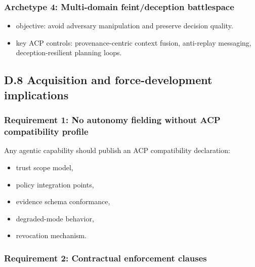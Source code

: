 \documentclass[
]{article}
\providecommand{\tightlist}{%
  \setlength{\itemsep}{0pt}\setlength{\parskip}{0pt}}
\begin{document}
\hypertarget{archetype-4-multi-domain-feintdeception-battlespace}{%
\subsubsection{Archetype 4: Multi-domain feint/deception
battlespace}\label{archetype-4-multi-domain-feintdeception-battlespace}}

\begin{itemize}
\tightlist
\item
  objective: avoid adversary manipulation and preserve decision quality.
\item
  key ACP controls: provenance-centric context fusion, anti-replay
  messaging, deception-resilient planning loops.
\end{itemize}

\hypertarget{d.8-acquisition-and-force-development-implications}{%
\subsection{D.8 Acquisition and force-development
implications}\label{d.8-acquisition-and-force-development-implications}}

\hypertarget{requirement-1-no-autonomy-fielding-without-acp-compatibility-profile}{%
\subsubsection{Requirement 1: No autonomy fielding without ACP
compatibility
profile}\label{requirement-1-no-autonomy-fielding-without-acp-compatibility-profile}}

Any agentic capability should publish an ACP compatibility declaration:

\begin{itemize}
\tightlist
\item
  trust scope model,
\item
  policy integration points,
\item
  evidence schema conformance,
\item
  degraded-mode behavior,
\item
  revocation mechanism.
\end{itemize}

\hypertarget{requirement-2-contractual-enforcement-clauses}{%
\subsubsection{Requirement 2: Contractual enforcement
clauses}\label{requirement-2-contractual-enforcement-clauses}}
\end{document}
